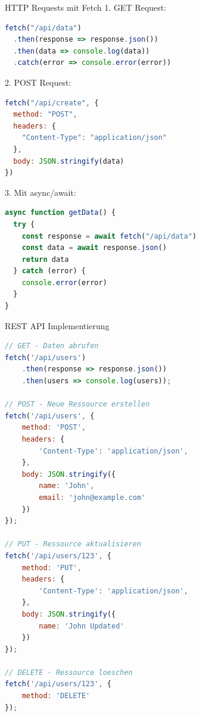\begin{KR}{HTTP Requests mit Fetch}
1. GET Request:
\begin{lstlisting}[language=JavaScript, style=basesmol]
fetch("/api/data")
  .then(response => response.json())
  .then(data => console.log(data))
  .catch(error => console.error(error))
\end{lstlisting}

2. POST Request:
\begin{lstlisting}[language=JavaScript, style=basesmol]
fetch("/api/create", {
  method: "POST",
  headers: {
    "Content-Type": "application/json"
  },
  body: JSON.stringify(data)
})
\end{lstlisting}

3. Mit async/await:
\begin{lstlisting}[language=JavaScript, style=basesmol]
async function getData() {
  try {
    const response = await fetch("/api/data")
    const data = await response.json()
    return data
  } catch (error) {
    console.error(error)
  }
}
\end{lstlisting}
\end{KR}

\begin{KR}{REST API Implementierung}
\begin{lstlisting}[language=JavaScript, style=basesmol]
// GET - Daten abrufen
fetch('/api/users')
    .then(response => response.json())
    .then(users => console.log(users));

// POST - Neue Ressource erstellen
fetch('/api/users', {
    method: 'POST',
    headers: {
        'Content-Type': 'application/json',
    },
    body: JSON.stringify({
        name: 'John',
        email: 'john@example.com'
    })
});

// PUT - Ressource aktualisieren
fetch('/api/users/123', {
    method: 'PUT',
    headers: {
        'Content-Type': 'application/json',
    },
    body: JSON.stringify({
        name: 'John Updated'
    })
});

// DELETE - Ressource loeschen
fetch('/api/users/123', {
    method: 'DELETE'
});
\end{lstlisting}
\end{KR}

